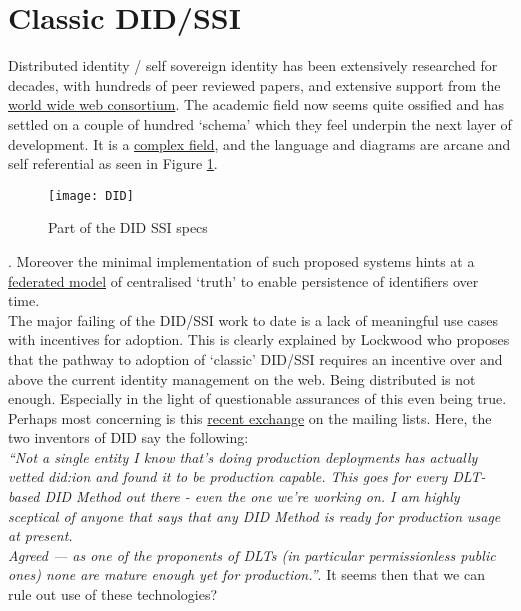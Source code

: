 \section{Classic DID/SSI}
Distributed identity / self sovereign identity has been extensively researched for decades, with hundreds of peer reviewed papers, and extensive support from the \href{https://www.w3.org/TR/did-core/}{world wide web consortium}. The academic field now seems quite ossified and has settled on a couple of hundred `schema' which they feel underpin the next layer of development. It is a \href{https://medium.com/decentralized-identity/overview-of-decentralized-identity-standards-f82efd9ab6c7}{complex field}, and the language and diagrams are arcane and self referential as seen in Figure \ref{fig:DID}.
\begin{figure}
\texttt{[image: DID]}
  \caption{Part of the DID SSI specs}
  \label{fig:DID}
\end{figure}. 
Moreover the minimal implementation of such proposed systems hints at a \href{https://www.w3.org/community/perma-id/}{federated model} of centralised `truth' to enable persistence of identifiers over time.\\
The major failing of the DID/SSI work to date is a lack of meaningful use cases with incentives for adoption. This is clearly explained by Lockwood \cite{lockwood2021exploring} who proposes that the pathway to adoption of `classic' DID/SSI requires an incentive over and above the current identity management on the web. Being distributed is not enough. Especially in the light of questionable assurances of this even being true.\\
Perhaps most concerning is this \href{https://lists.w3.org/Archives/Public/public-credentials/2022Mar/thread.html}{recent exchange} on the mailing lists. Here, the two inventors of DID say the following:\\
\textit{``Not a single entity I know that's doing production deployments has actually vetted did:ion and found it to be production capable. This goes for every DLT-based DID Method out there - even the one we're working on. I am highly sceptical of anyone that says that any DID Method is ready for production usage at present.\\
Agreed — as one of the proponents of DLTs (in particular permissionless public ones) none are mature enough yet for production.''}.
It seems then that we can rule out use of these technologies?

